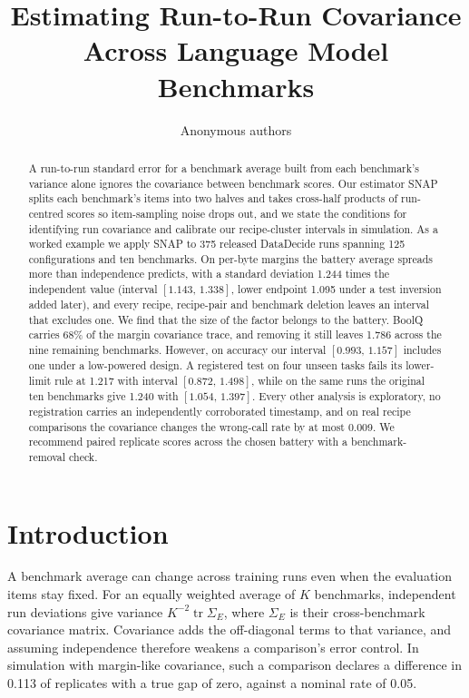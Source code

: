\documentclass{article}
\title{Estimating Run-to-Run Covariance\\Across Language Model Benchmarks}
\author{Anonymous authors}
\newcommand{\ci}[2]{\ensuremath{[#1,\,#2]}}
\newcommand{\Sig}{\Sigma_E}
\begin{document}
\maketitle
\begin{abstract}
A run-to-run standard error for a benchmark average built from each benchmark's variance alone ignores the covariance between benchmark scores. Our estimator SNAP splits each benchmark's items into two halves and takes cross-half products of run-centred scores so item-sampling noise drops out, and we state the conditions for identifying run covariance and calibrate our recipe-cluster intervals in simulation. As a worked example we apply SNAP to 375 released DataDecide runs spanning 125 configurations and ten benchmarks. On per-byte margins the battery average spreads more than independence predicts, with a standard deviation 1.244 times the independent value (interval \ci{1.143}{1.338}, lower endpoint 1.095 under a test inversion added later), and every recipe, recipe-pair and benchmark deletion leaves an interval that excludes one. We find that the size of the factor belongs to the battery. BoolQ carries 68\% of the margin covariance trace, and removing it still leaves 1.786 across the nine remaining benchmarks. However, on accuracy our interval \ci{0.993}{1.157} includes one under a low-powered design. A registered test on four unseen tasks fails its lower-limit rule at 1.217 with interval \ci{0.872}{1.498}, while on the same runs the original ten benchmarks give 1.240 with \ci{1.054}{1.397}. Every other analysis is exploratory, no registration carries an independently corroborated timestamp, and on real recipe comparisons the covariance changes the wrong-call rate by at most 0.009. We recommend paired replicate scores across the chosen battery with a benchmark-removal check.
\end{abstract}

\section{Introduction}
A benchmark average can change across training runs even when the evaluation items stay fixed. For an equally weighted average of $K$ benchmarks, independent run deviations give variance $K^{-2}\operatorname{tr}\Sig$, where $\Sig$ is their cross-benchmark covariance matrix. Covariance adds the off-diagonal terms to that variance, and assuming independence therefore weakens a comparison's error control. In simulation with margin-like covariance, such a comparison declares a difference in 0.113 of replicates with a true gap of zero, against a nominal rate of 0.05.
\end{document}
